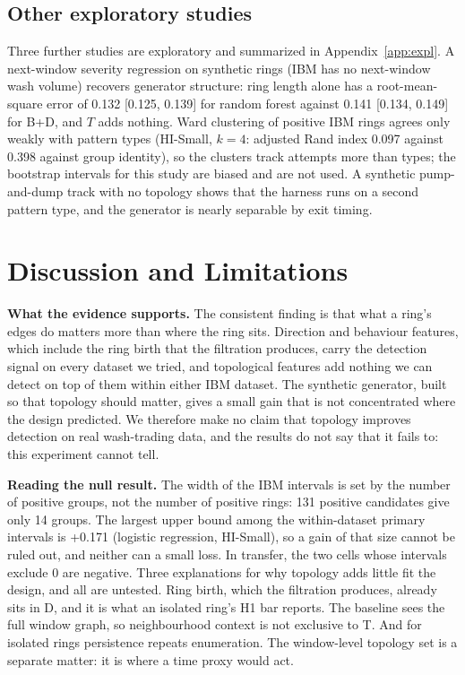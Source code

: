 \documentclass[conference]{IEEEtran}
\begin{document}
\subsection{Other exploratory studies}
Three further studies are exploratory and summarized in Appendix~\ref{app:expl}. A next-window severity regression on synthetic rings (IBM has no next-window wash volume) recovers generator structure: ring length alone has a root-mean-square error of 0.132 [0.125, 0.139] for random forest against 0.141 [0.134, 0.149] for B+D, and $T$ adds nothing. Ward clustering of positive IBM rings agrees only weakly with pattern types (HI-Small, $k=4$: adjusted Rand index 0.097 against 0.398 against group identity), so the clusters track attempts more than types; the bootstrap intervals for this study are biased and are not used. A synthetic pump-and-dump track with no topology shows that the harness runs on a second pattern type, and the generator is nearly separable by exit timing.

\section{Discussion and Limitations}
\label{sec:discussion}

\textbf{What the evidence supports.} The consistent finding is that what a ring's edges do matters more than where the ring sits. Direction and behaviour features, which include the ring birth that the filtration produces, carry the detection signal on every dataset we tried, and topological features add nothing we can detect on top of them within either IBM dataset. The synthetic generator, built so that topology should matter, gives a small gain that is not concentrated where the design predicted. We therefore make no claim that topology improves detection on real wash-trading data, and the results do not say that it fails to: this experiment cannot tell.

\textbf{Reading the null result.} The width of the IBM intervals is set by the number of positive groups, not the number of positive rings: 131 positive candidates give only 14 groups. The largest upper bound among the within-dataset primary intervals is +0.171 (logistic regression, HI-Small), so a gain of that size cannot be ruled out, and neither can a small loss. In transfer, the two cells whose intervals exclude 0 are negative. Three explanations for why topology adds little fit the design, and all are untested. Ring birth, which the filtration produces, already sits in D, and it is what an isolated ring's H1 bar reports. The baseline sees the full window graph, so neighbourhood context is not exclusive to T. And for isolated rings persistence repeats enumeration. The window-level topology set is a separate matter: it is where a time proxy would act.
\end{document}
